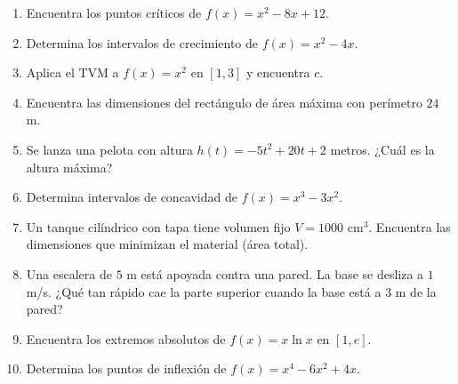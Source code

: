\documentclass[12pt, letterpaper]{article}
\begin{document}
\begin{enumerate}[resume=ejercicios, leftmargin=*]
  \item \facil{} Encuentra los puntos críticos de $f(x) = x^2 - 8x + 12$.

  \item \facil{} Determina los intervalos de crecimiento de $f(x) = x^2 - 4x$.

  \item \facil{} Aplica el TVM a $f(x) = x^2$ en $[1, 3]$ y encuentra $c$.

  \item \medio{} Encuentra las dimensiones del rectángulo de área máxima con perímetro $24$ m.

  \item \medio{} Se lanza una pelota con altura $h(t) = -5t^2 + 20t + 2$ metros. ¿Cuál es la altura máxima?

  \item \medio{} Determina intervalos de concavidad de $f(x) = x^3 - 3x^2$.

  \item \dificil{} Un tanque cilíndrico con tapa tiene volumen fijo $V = 1000$ cm$^3$. Encuentra las dimensiones que minimizan el material (área total).

  \item \dificil{} Una escalera de $5$ m está apoyada contra una pared. La base se desliza a $1$ m/s. ¿Qué tan rápido cae la parte superior cuando la base está a $3$ m de la pared?

  \item \dificil{} Encuentra los extremos absolutos de $f(x) = x \ln x$ en $[1, e]$.

  \item \dificil{} Determina los puntos de inflexión de $f(x) = x^4 - 6x^2 + 4x$.
\end{enumerate}
\end{document}
